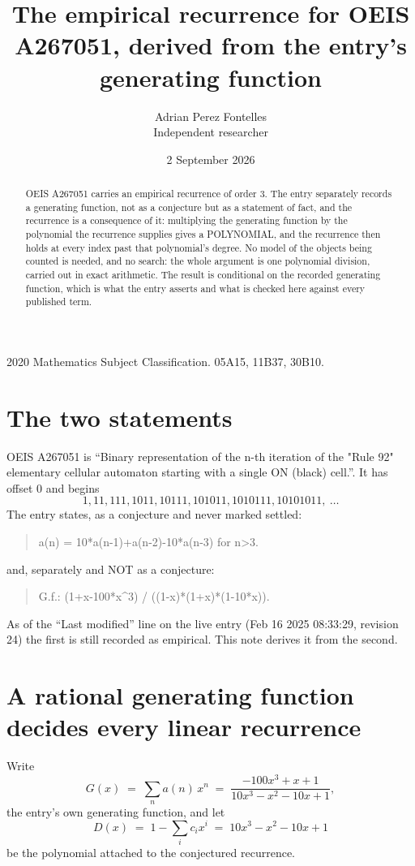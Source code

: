 \documentclass[11pt,a4paper]{article}
\title{The empirical recurrence for OEIS A267051, derived from the entry's generating function}
\author{Adrian Perez Fontelles\\ \small Independent researcher}
\date{2 September 2026}
\theoremstyle{plain}
\theoremstyle{definition}
\begin{document}
\maketitle

\begin{abstract}
OEIS A267051 carries an empirical recurrence of order $3$. The entry separately records a
generating function, not as a conjecture but as a statement of fact, and the recurrence is a
consequence of it: multiplying the generating function by the polynomial the recurrence
supplies gives a POLYNOMIAL, and the recurrence then holds at every index past that
polynomial's degree. No model of the objects being counted is needed, and no search: the
whole argument is one polynomial division, carried out in exact arithmetic. The result is
conditional on the recorded generating function, which is what the entry asserts and what is
checked here against every published term.
\end{abstract}

\noindent\small 2020 Mathematics Subject Classification. 05A15, 11B37, 30B10.\normalsize

\section{The two statements}

OEIS A267051 is ``Binary representation of the n-th iteration of the "Rule 92" elementary cellular automaton starting with a single ON (black) cell.''. It has offset $0$ and begins
\[
1, 11, 111, 1011, 10111, 101011, 1010111, 10101011,\ \dots
\]
The entry states, as a conjecture and never marked settled:
\begin{quote}
a(n) = 10*a(n-1)+a(n-2)-10*a(n-3) for n>3.
\end{quote}
and, separately and NOT as a conjecture:
\begin{quote}
G.f.: (1+x-100*x\^{}3) / ((1-x)*(1+x)*(1-10*x)).
\end{quote}
As of the ``Last modified'' line on the live entry (Feb 16 2025 08:33:29, revision 24) the first is still
recorded as empirical. This note derives it from the second.

\section{A rational generating function decides every linear recurrence}

Write
\[
G(x)\;=\;\sum_{n}a(n)\,x^{n}\;=\;\frac{- 100 x^{3} + x + 1}{10 x^{3} - x^{2} - 10 x + 1},
\]
the entry's own generating function, and let
\[
D(x)\;=\;1-\sum_i c_i x^{i}\;=\;10 x^{3} - x^{2} - 10 x + 1
\]
be the polynomial attached to the conjectured recurrence.
\end{document}
